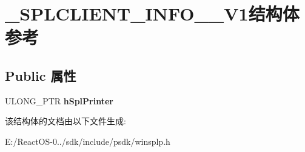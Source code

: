 \hypertarget{struct___s_p_l_c_l_i_e_n_t___i_n_f_o__2___v1}{}\section{\+\_\+\+S\+P\+L\+C\+L\+I\+E\+N\+T\+\_\+\+I\+N\+F\+O\+\_\+\_\+\+V1结构体 参考}
\label{struct___s_p_l_c_l_i_e_n_t___i_n_f_o__2___v1}
\subsection*{Public 属性}
\begin{DoxyCompactItemize}
\item 
\mbox{\label{struct___s_p_l_c_l_i_e_n_t___i_n_f_o__2___v1_aa7bd54b561ca12a9520b33240910b402}} 
U\+L\+O\+N\+G\+\_\+\+P\+TR {\bfseries h\+Spl\+Printer}
\end{DoxyCompactItemize}


该结构体的文档由以下文件生成\+:\begin{DoxyCompactItemize}
\item 
E\+:/\+React\+O\+S-\/0../sdk/include/psdk/winsplp.\+h\end{DoxyCompactItemize}
